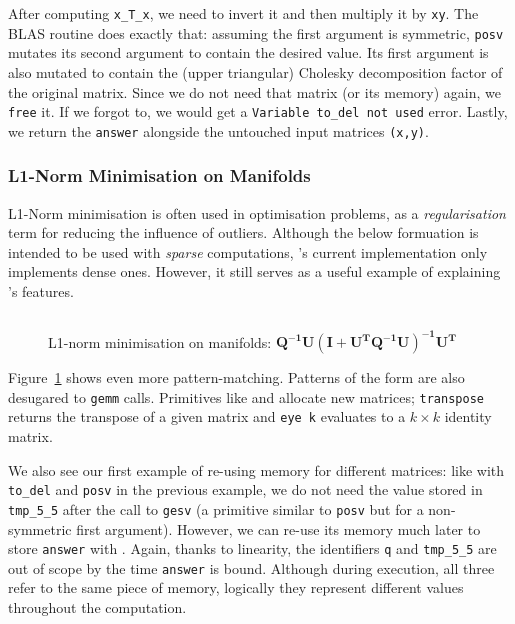 After computing \texttt{x\_T\_x}, we need to invert it and then multiply it by
\texttt{xy}. The BLAS routine 
does exactly that: assuming the first argument is symmetric, \texttt{posv}
mutates its second argument to contain the desired value. Its first argument is
also mutated to contain the (upper triangular) Cholesky decomposition factor of
the original matrix. Since we do not need that matrix (or its memory) again, we
\texttt{free} it. If we forgot to, we would get a \texttt{Variable to\_del not
used} error. Lastly, we return the \texttt{answer} alongside the untouched
input matrices \texttt{(x,y)}.

\subsubsection{L1-Norm Minimisation on Manifolds}

L1-Norm minimisation is often used in optimisation problems, as a
\emph{regularisation} term for reducing the influence of outliers.  Although
the below formuation\cite{bronstein} is intended to be used with \emph{sparse}
computations, \lang's current implementation only implements dense ones.
However, it still serves as a useful example of explaining \lang's features.

\begin{figure}[t]
    \centering
    \inputminted[fontsize=\small]{ocaml}{../../test/examples/l1_norm_min.lt}
    \caption{L1-norm minimisation on manifolds:
        $\mathbf{Q^{-1}U(I+U^TQ^{-1}U)^{-1}U^T}$}\label{fig:lang_l1_norm_min}
\end{figure}

Figure~\ref{fig:lang_l1_norm_min} shows even more pattern-matching. Patterns of
the form  are also desugared to
\texttt{gemm} calls. Primitives like  and  allocate new matrices;
\texttt{transpose} returns the transpose of a given matrix and \texttt{eye k}
evaluates to a $k \times k$ identity matrix.

We also see our first example of re-using memory for different matrices: like
with \texttt{to\_del} and \texttt{posv} in the previous example, we do not need
the value stored in \texttt{tmp\_5\_5} after the call to \texttt{gesv} (a
primitive similar to \texttt{posv} but for a non-symmetric first argument).
However, we can re-use its memory much later to store \texttt{answer} with
. Again, thanks to
linearity, the identifiers \texttt{q} and \texttt{tmp\_5\_5} are out of scope
by the time \texttt{answer} is bound. Although during execution, all three
refer to the same piece of memory, logically they represent different values
throughout the computation.

